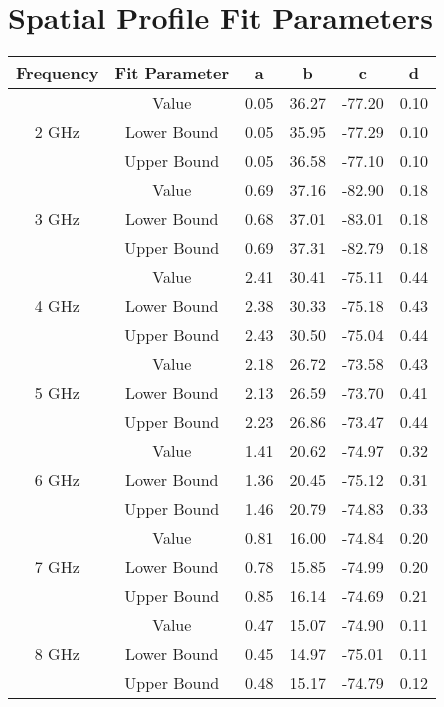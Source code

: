 \chapter{Spatial Profile Fit Parameters}
	\def\arraystretch{1}
	\begin{table}
		\centering
			\begin{tabular}{||c | c || c c c c||} 
				\hline
				Frequency & Fit Parameter & a & b & c & d \\ [0.5ex] 
				\hline\hline
				\multirow{3}{4em}{2 GHz} & Value & 0.05 & 36.27 & -77.20 & 0.10	 \\ 
				& Lower Bound & 0.05 & 35.95 & -77.29 & 0.10 \\ 
				& Upper Bound & 0.05 & 36.58 & -77.10 & 0.10 \\ 
				\hline
				\multirow{3}{4em}{3 GHz} & Value & 0.69 & 37.16 & -82.90 & 0.18  \\ 
				& Lower Bound & 0.68 & 37.01 & -83.01 & 0.18 \\ 
				& Upper Bound & 0.69 & 37.31 & -82.79 & 0.18 \\ 
				\hline
				\multirow{3}{4em}{4 GHz} & Value & 2.41 & 30.41 & -75.11 & 0.44 \\ 
				& Lower Bound & 2.38 & 30.33 & -75.18 & 0.43 \\ 
				& Upper Bound & 2.43 & 30.50 & -75.04 & 0.44 \\ 
				\hline
				\multirow{3}{4em}{5 GHz} & Value & 2.18 & 26.72 & -73.58 & 0.43 \\ 
				& Lower Bound & 2.13 & 26.59 & -73.70 & 0.41 \\ 
				& Upper Bound & 2.23 & 26.86 & -73.47 & 0.44 \\ 
				\hline
				\multirow{3}{4em}{6 GHz} & Value & 1.41 & 20.62 & -74.97 & 0.32 \\ 
				& Lower Bound & 1.36 & 20.45 & -75.12 & 0.31 \\ 
				& Upper Bound & 1.46 & 20.79 & -74.83 & 0.33 \\ 
				\hline
				\multirow{3}{4em}{7 GHz} & Value & 0.81 & 16.00 & -74.84 & 0.20 \\ 
				& Lower Bound & 0.78 & 15.85 & -74.99 & 0.20 \\ 
				& Upper Bound & 0.85 & 16.14 & -74.69 & 0.21 \\ 
				\hline
				\multirow{3}{4em}{8 GHz} & Value & 0.47 & 15.07 & -74.90 & 0.11 \\ 
				& Lower Bound & 0.45 & 14.97 & -75.01 & 0.11 \\ 
				& Upper Bound & 0.48 & 15.17 & -74.79 & 0.12 \\ 

\end{tabular}
\end{table}
